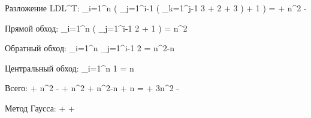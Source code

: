 Разложение LDL^T:
\sum_{i=1}^{n} \left( \sum_{j=1}^{i-1} \left( \sum_{k=1}^{j-1} 3 + 2 + 3 \right) + 1 \right) =  + n^2 - 

Прямой обход:
\sum_{i=1}^{n} \left( \sum_{j=1}^{i-1} 2 + 1 \right) = n^2

Обратный обход:
\sum_{i=1}^{n} \sum_{j=1}^{i-1} 2  = n^2-n

Центральный обход:
\sum_{i=1}^{n} 1  = n

Всего:
 + n^2 -  + n^2 + n^2-n + n =  + 3n^2 - 

Метод Гаусса:
 +  + 